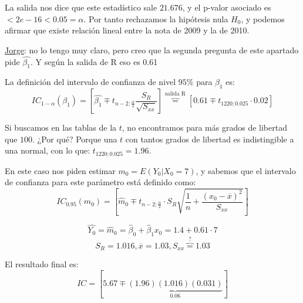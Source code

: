 \begin{problem}[1]
La salida nos dice que este estadístico sale $21.676$, y el p-valor asociado es $<2e-16<0.05=α$. Por tanto rechazamos la hipótesis nula $H_0$, y podemos afirmar que existe relación lineal entre la nota de 2009 y la de 2010.

{\color{gray} \underline{Jorge}: no lo tengo muy claro, pero creo que la segunda pregunta de este apartado pide $\hat{β_1}$. Y según la salida de R eso es 0.61}

\spart
La definición del intervalo de confianza de nivel $95\%$ para $β_1$ es:
\[IC_{1-α}(β_1) = \left[ \hat{β_1} \mp t_{n-2;\frac{α}{2}} \frac{S_R}{\sqrt{S_{xx}}} \right] \overbrace{=}^{\text{salida R}} \left[ 0.61 \mp t_{1220;0.025} · 0.02 \right]\]

Si buscamos en las tablas de la $t$, no encontramos para más grados de libertad que $100$. ¿Por qué? Porque una $t$ con tantos grados de libertad es indistingible a una normal, con lo que: $t_{1220;0.025} = 1.96$.

\spart
En este caso nos piden estimar $m_0 = E(Y_0|X_0=7)$, y sabemos que el intervalo de confianza para este parámetro
está definido como:
\[IC_{0.95}(m_0) = \left[ \hat{m}_0 \mp t_{n-2;\frac{α}{2}} · S_R\sqrt{\frac{1}{n} + \frac{(x_0 - \overline{x})^2}{S_{xx}}} \right]\]

\[\hat{Y_0} = \hat{m}_0 = \hat{β}_0 + \hat{β}_1x_0 = 1.4 + 0.61·7\]
\[S_R = 1.016, \overline{x}=1.03, S_{xx} \overbrace{=}^{?} 1.03\]

El resultado final es:
\[
IC = [5.67 \mp \underbrace{(1.96)(1.016)(0.031)}_{0.06}]
\]

\end{problem}



